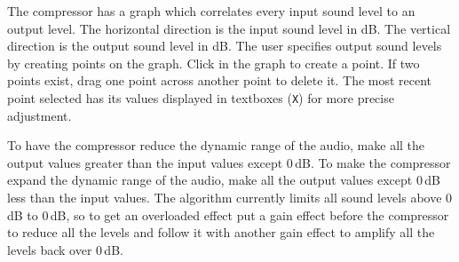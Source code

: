 The compressor has a graph which correlates every input sound level to an output level. The horizontal direction is the input sound level in dB. The vertical direction is the output sound level in dB. The user specifies output sound levels by creating points on the graph. Click in the graph to create a point. If two points exist, drag one point across another point to delete it. The most recent point selected has its values displayed in textboxes (\texttt{X}) for more precise adjustment.

To have the compressor reduce the dynamic range of the audio, make all the output values greater than the input values except $0$\,dB. To make the compressor expand the dynamic range of the audio, make all the output values except $0$\,dB less than the input values. The algorithm currently limits all sound levels above $0$\,dB to $0$\,dB, so to get an overloaded effect put a gain effect before the compressor to reduce all the levels and follow it with another gain effect to amplify all the levels back over $0$\,dB.

